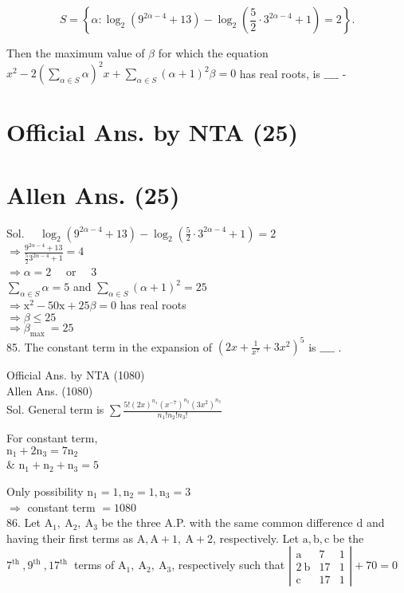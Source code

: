 \documentclass[10pt]{article}
\begin{document}
\[
S=\left\{\alpha: \log _{2}\left(9^{2 \alpha-4}+13\right)-\log _{2}\left(\frac{5}{2} \cdot 3^{2 \alpha-4}+1\right)=2\right\} .
\]

Then the maximum value of \(\beta\) for which the equation \(x^{2}-2\left(\sum_{\alpha \in S} \alpha\right)^{2} x+\sum_{\alpha \in S}(\alpha+1)^{2} \beta=0\) has real roots, is \(\_\_\_\_\) -

\section*{Official Ans. by NTA (25)}
\section*{Allen Ans. (25)}
Sol. \(\quad \log _{2}\left(9^{2 \alpha-4}+13\right)-\log _{2}\left(\frac{5}{2} \cdot 3^{2 \alpha-4}+1\right)=2\)\\
\(\Rightarrow \frac{9^{2 \alpha-4}+13}{\frac{5}{2} 3^{2 \alpha-4}+1}=4\)\\
\(\Rightarrow \alpha=2 \quad\) or \(\quad 3\)\\
\(\sum_{\alpha \in S} \alpha=5\) and \(\sum_{\alpha \in S}(\alpha+1)^{2}=25\)\\
\(\Rightarrow \mathrm{x}^{2}-50 \mathrm{x}+25 \beta=0\) has real roots\\
\(\Rightarrow \beta \leq 25\)\\
\(\Rightarrow \beta_{\text {max }}=25\)\\
85. The constant term in the expansion of \(\left(2 x+\frac{1}{x^{7}}+3 x^{2}\right)^{5}\) is \(\_\_\_\_\) .

Official Ans. by NTA (1080)\\
Allen Ans. (1080)\\
Sol. General term is \(\sum \frac{5!(2 x)^{n_{1}}\left(x^{-7}\right)^{n_{2}}\left(3 x^{2}\right)^{n_{3}}}{n_{1}!n_{2}!n_{3}!}\)

For constant term,\\
\(\mathrm{n}_{1}+2 \mathrm{n}_{3}=7 \mathrm{n}_{2}\)\\
\& \(\mathrm{n}_{1}+\mathrm{n}_{2}+\mathrm{n}_{3}=5\)

Only possibility \(\mathrm{n}_{1}=1, \mathrm{n}_{2}=1, \mathrm{n}_{3}=3\)\\
\(\Rightarrow\) constant term \(=1080\)\\
86. Let \(\mathrm{A}_{1}, \mathrm{~A}_{2}, \mathrm{~A}_{3}\) be the three A.P. with the same common difference d and having their first terms as \(\mathrm{A}, \mathrm{A}+1, \mathrm{~A}+2\), respectively. Let \(\mathrm{a}, \mathrm{b}, \mathrm{c}\) be the \(7^{\text {th }}, 9^{\text {th }}, 17^{\text {th }}\) terms of \(\mathrm{A}_{1}, \mathrm{~A}_{2}, \mathrm{~A}_{3}\), respectively such that \(\left|\begin{array}{lll}\mathrm{a} & 7 & 1 \\ 2 \mathrm{~b} & 17 & 1 \\ \mathrm{c} & 17 & 1\end{array}\right|+70=0\)
\end{document}
